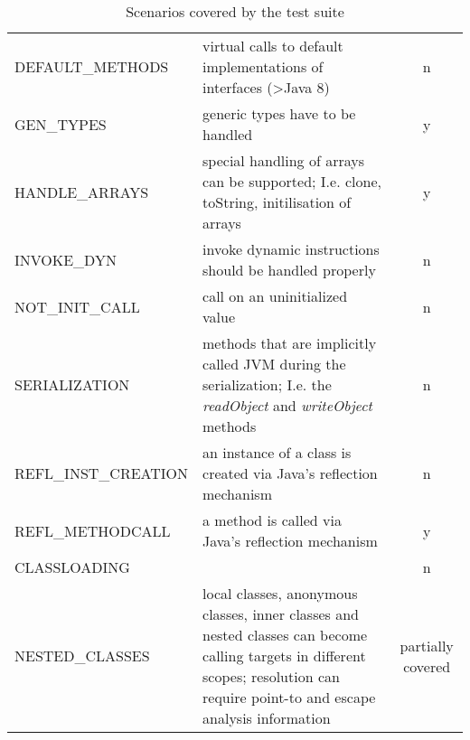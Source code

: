 \begin{table}[htpb]
\begin{tabularx}{\textwidth}{ l X c}
		DEFAULT\_METHODS                            & virtual calls to default implementations of interfaces (\textgreater Java 8)                                                                                         & n                 \\
		\rowcolor{light-gray}
		GEN\_TYPES          & generic types have to be handled                                                                                                                                     & y                 \\
		HANDLE\_ARRAYS                              & special handling of arrays can be supported; I.e. clone, toString, initilisation of arrays                                                                           & y                 \\
		\rowcolor{light-gray}
		INVOKE\_DYN         & invoke dynamic instructions should be handled properly                                                                                                               & n                 \\
		NOT\_INIT\_CALL                             & call on an uninitialized value                                                                                                                                       & n                 \\
		\rowcolor{light-gray}
		SERIALIZATION       & methods that are implicitly called JVM during the serialization; I.e. the \emph{readObject} and \emph{writeObject} methods                                           & n                 \\
		REFL\_INST\_CREATION                        & an instance of a class is created via Java's reflection mechanism                                                                                                    & n                 \\
		\rowcolor{light-gray}
		REFL\_METHODCALL    & a method is called via Java's reflection 
		mechanism                                                                                                                & y                 \\
		CLASSLOADING                                
		&                                                                                                                                                                      & n\\
				\rowcolor{light-gray}
		NESTED\_CLASSES & local classes, anonymous classes, inner classes and nested classes can become calling targets in different scopes; resolution can require point-to and escape analysis information & partially covered
	\end{tabularx}
	\centering
	\caption{Scenarios covered by the test suite}
	\label{table:results_casestudy}
\end{table}